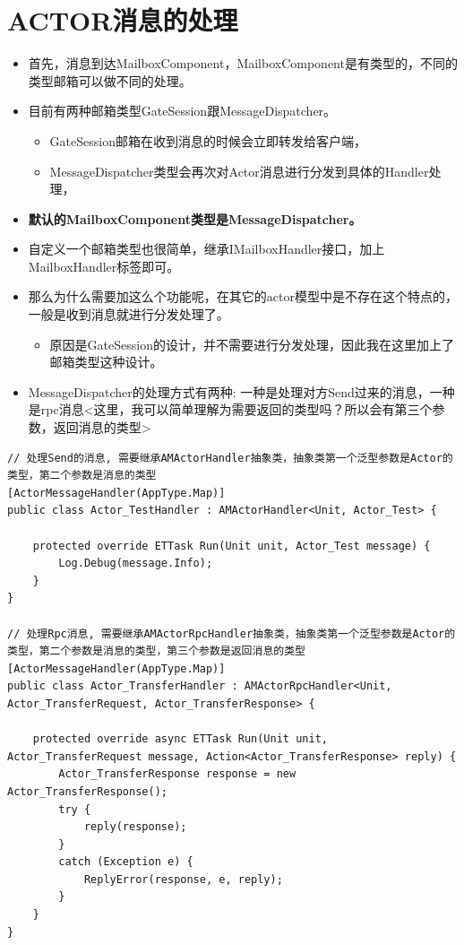 \documentclass[9pt, b5paper]{article}
\begin{document}
\section{ACTOR消息的处理}
\label{sec-26}
\begin{itemize}
\item 首先，消息到达MailboxComponent，MailboxComponent是有类型的，不同的类型邮箱可以做不同的处理。
\item 目前有两种邮箱类型GateSession跟MessageDispatcher。
\begin{itemize}
\item GateSession邮箱在收到消息的时候会立即转发给客户端，
\item MessageDispatcher类型会再次对Actor消息进行分发到具体的Handler处理，
\end{itemize}
\item \textbf{默认的MailboxComponent类型是MessageDispatcher。}
\item 自定义一个邮箱类型也很简单，继承IMailboxHandler接口，加上MailboxHandler标签即可。
\item 那么为什么需要加这么个功能呢，在其它的actor模型中是不存在这个特点的，一般是收到消息就进行分发处理了。
\begin{itemize}
\item 原因是GateSession的设计，并不需要进行分发处理，因此我在这里加上了邮箱类型这种设计。
\end{itemize}
\item MessageDispatcher的处理方式有两种: 一种是处理对方Send过来的消息，一种是rpc消息<这里，我可以简单理解为需要返回的类型吗？所以会有第三个参数，返回消息的类型>
\end{itemize}
\begin{verbatim}
// 处理Send的消息, 需要继承AMActorHandler抽象类，抽象类第一个泛型参数是Actor的类型，第二个参数是消息的类型
[ActorMessageHandler(AppType.Map)]
public class Actor_TestHandler : AMActorHandler<Unit, Actor_Test> {

    protected override ETTask Run(Unit unit, Actor_Test message) {
        Log.Debug(message.Info);
    }
}

// 处理Rpc消息, 需要继承AMActorRpcHandler抽象类，抽象类第一个泛型参数是Actor的类型，第二个参数是消息的类型，第三个参数是返回消息的类型
[ActorMessageHandler(AppType.Map)]
public class Actor_TransferHandler : AMActorRpcHandler<Unit, Actor_TransferRequest, Actor_TransferResponse> {

    protected override async ETTask Run(Unit unit, Actor_TransferRequest message, Action<Actor_TransferResponse> reply) {
        Actor_TransferResponse response = new Actor_TransferResponse();
        try {
            reply(response);
        }
        catch (Exception e) {
            ReplyError(response, e, reply);
        }
    }
}
\end{verbatim}
\end{document}
